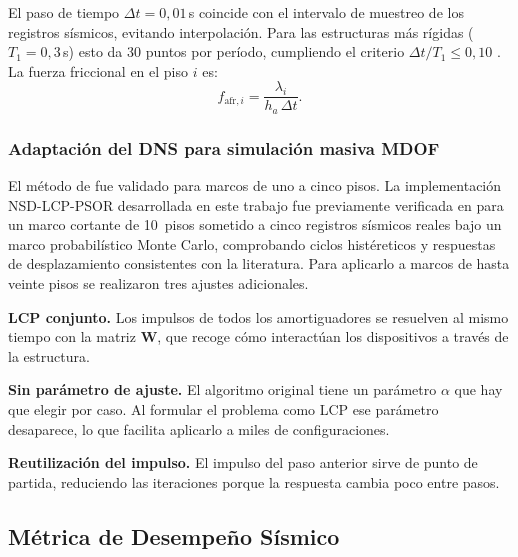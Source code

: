 \documentclass[preprint,12pt,authoryear]{elsarticle}
\newcommand{\ha}{h_a}
\begin{document}
El paso de tiempo $\Delta t = 0{,}01$\,s coincide con el intervalo de
muestreo de los registros sísmicos, evitando interpolación. Para las
estructuras más rígidas ($T_1 = 0{,}3$\,s) esto da 30 puntos por período,
cumpliendo el criterio $\Delta t / T_1 \leq 0{,}10$
\citep{chopra_dynamics_2015}. La fuerza friccional en el piso $i$ es:
\begin{equation}
    f_{\mathrm{afr},i} = \frac{\lambda_i}{\ha\,\Delta t}.
    \label{eq:ffrict}
\end{equation}

\subsubsection*{Adaptación del DNS para simulación masiva MDOF}

El método de \citet{Namorado2024} fue validado para marcos de uno a cinco
pisos. La implementación NSD-LCP-PSOR desarrollada en este trabajo fue
previamente verificada en \citet{Ponce2026} para un marco cortante de
10~pisos sometido a cinco registros sísmicos reales bajo un marco
probabilístico Monte Carlo, comprobando ciclos histéreticos y respuestas de
desplazamiento consistentes con la literatura. Para aplicarlo a marcos de
hasta veinte pisos se realizaron tres ajustes adicionales.

\textbf{LCP conjunto.} Los impulsos de todos los amortiguadores se resuelven
al mismo tiempo con la matriz $\bm{W}$, que recoge cómo interactúan los
dispositivos a través de la estructura.

\textbf{Sin parámetro de ajuste.} El algoritmo original tiene un parámetro
$\alpha$ que hay que elegir por caso. Al formular el problema como LCP ese
parámetro desaparece, lo que facilita aplicarlo a miles de configuraciones.

\textbf{Reutilización del impulso.} El impulso del paso anterior sirve de
punto de partida, reduciendo las iteraciones porque la respuesta cambia poco
entre pasos.

\subsection{Métrica de Desempeño Sísmico}
\label{sec:theory:metrica}
\end{document}
